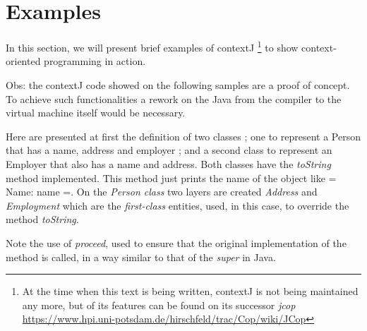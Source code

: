 \documentclass[journal,10pt,compsoc]{IEEEtran}
\begin{document}
\section{Examples}
\label{sec:org905a739}
In this section, we will present brief examples of contextJ \footnote{At the time when this text is being written, contextJ is not being maintained any more, but of its features can be found on its successor \emph{jcop} \url{https://www.hpi.uni-potsdam.de/hirschfeld/trac/Cop/wiki/JCop}} \cite{appeltauer2011contextj} 
to show context-oriented programming in action.

Obs: the contextJ code showed on the following samples are a proof of concept. To achieve such functionalities 
a rework on the Java from the compiler to the virtual machine itself would be necessary. 

Here are presented at first the definition of two classes ; one to represent a Person that has a name, address and employer ; and a second 
class to represent an Employer that also has a name and address.
Both classes have the \emph{toString} method implemented. This method just prints the name of the object like = Name: name =. 
On the \emph{Person class} two layers are created \emph{Address} and \emph{Employment} which are the \emph{first-class} entities, used, in this case, to
override the method \emph{toString}. 

Note the use of \emph{proceed}, used to ensure that the original implementation of the method is called, in a way similar to that of the
\emph{super} in Java.
\end{document}
